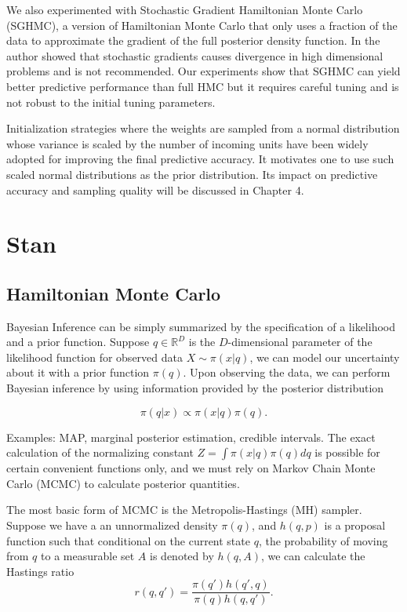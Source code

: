 \documentclass[12pt]{report}
\begin{document}
We also experimented with Stochastic Gradient Hamiltonian Monte Carlo (SGHMC), a version of Hamiltonian Monte Carlo that only uses a fraction of the data to approximate the gradient of the full posterior density function. In \cite{betancourt2015fundamental} the author showed that stochastic gradients causes divergence in high dimensional problems and is not recommended. Our experiments show that SGHMC can yield better predictive performance than full HMC but it requires careful tuning and is not robust to the initial tuning parameters. 

Initialization strategies where the weights are sampled from a normal distribution whose variance is scaled by the number of incoming units have been widely adopted for improving the final predictive accuracy. It motivates one to use such scaled normal distributions as the prior distribution. Its impact on predictive accuracy and sampling quality will be discussed in Chapter 4. 

\chapter{Stan}
\section{Hamiltonian Monte Carlo}

Bayesian Inference can be simply summarized by the specification of a likelihood and a prior function. Suppose $q \in \mathbb{R}^D$ is the $D$-dimensional parameter of the likelihood function for observed data $X \sim \pi(x|q)$, we can
model our uncertainty about it with a prior function $\pi(q)$. Upon observing the data, we can perform Bayesian inference by using information provided by the posterior distribution 

\[ \pi(q | x ) \propto \pi(x | q) \pi(q) .\]

Examples: MAP, marginal posterior estimation, credible intervals. The exact calculation of the normalizing constant $Z = \int \pi(x | q) \pi(q) dq $ is possible for certain convenient functions only, and we must rely on Markov Chain Monte Carlo (MCMC) to calculate posterior quantities. 


The most basic form of MCMC is the Metropolis-Hastings (MH) sampler. Suppose we have a an unnormalized density $\pi(q)$, and $h(q,p)$ is a proposal function such that conditional on the current state $q$, the probability of moving from $q$ to a measurable set $A$ is denoted by $h(q,A)$, we can calculate the Hastings ratio
\[ r(q,q') = \frac{\pi(q')h(q',q)}{\pi(q)h(q,q')}. \]
\end{document}
